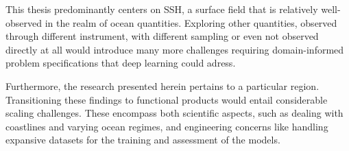 \begin{bibunit}
This thesis predominantly centers on SSH, a surface field that is relatively well-observed in the realm of ocean quantities. Exploring other quantities, observed through different instrument, with different sampling or even not observed directly at all would introduce many more challenges requiring domain-informed problem specifications that deep learning could adress.

Furthermore, the research presented herein pertains to a particular region. Transitioning these findings to functional products would entail considerable scaling challenges. These encompass both scientific aspects, such as dealing with coastlines and varying ocean regimes, and engineering concerns like handling expansive datasets for the training and assessment of the models.








\end{bibunit}
